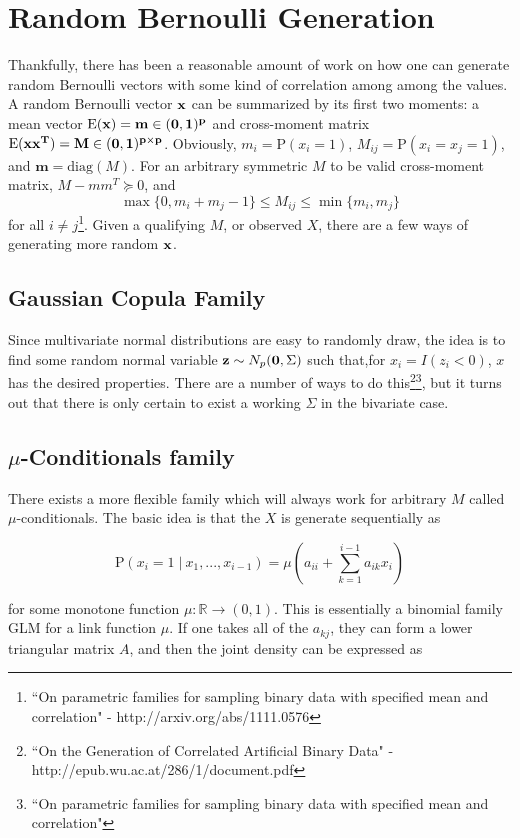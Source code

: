 \documentclass[11pt]{article}
\newcommand{\R}{\mathbb{R}}
\newcommand{\p}{\mathrm{P}}
\newcommand{\E}{\mathrm{E}}
\newcommand{\diag}{\mathrm{diag}}
\newcommand{\st}{ \; \big | \:}
\theoremstyle{definition}
\begin{document}
\section{Random Bernoulli Generation}
    Thankfully, there has been a reasonable amount of work on how one can generate random Bernoulli vectors with some kind of correlation among among the values. A random Bernoulli vector $\bf x$ can be summarized by its first two moments: a mean vector $\E(\bf x)=m\in(0,1)^p$ and cross-moment matrix $\E(\bf x\bf x^T)=M\in(0,1)^{p\times p}$. Obviously, $m_i = \p(x_i=1)$, $M_{ij} = \p(x_i=x_j=1)$, and $\mathbf m=\diag(M)$. For an arbitrary symmetric $M$ to be valid cross-moment matrix, $M-mm^T\succeq0$, and
    \[ \max\{0,m_i+m_j -1\} \leq M_{ij} \leq \min\{m_i,m_j\}\]
    for all $i\neq j$\footnote{``On parametric families for sampling binary data with specified mean and correlation" - http://arxiv.org/abs/1111.0576}. Given a qualifying $M$, or observed $X$, there are a few ways of generating more random $\bf x$.

\subsection{Gaussian Copula Family}
    Since multivariate normal distributions are easy to randomly draw, the idea is to find some random normal variable $\mathbf z\sim N_p({\bf 0},\Sigma)$ such that,for $x_i = I(z_i<0)$, $x$ has the desired properties. There are a number of ways to do this\footnote{``On the Generation of Correlated Artificial Binary Data" - http://epub.wu.ac.at/286/1/document.pdf}\footnote{``On parametric families for sampling binary data with specified mean and correlation"}, but it turns out that there is only certain to exist a working $\Sigma$ in the bivariate case. 

\subsection{$\mu$-Conditionals family}
    There exists a more flexible family which will always work for arbitrary $M$ called $\mu$-conditionals. The basic idea is that the $X$ is generate sequentially as 

    \[ \p(x_{i}=1\st x_{1},...,x_{i-1}) = \mu\left(a_{ii}+\sum_{k=1}^{i-1}a_{ik}x_i\right) \]

    for some monotone function $\mu:\R\to(0,1)$. This is essentially a binomial family GLM for a link function $\mu$. If one takes all of the $a_{kj}$, they can form a lower triangular matrix $A$, and then the joint density can be expressed as 
\end{document}
